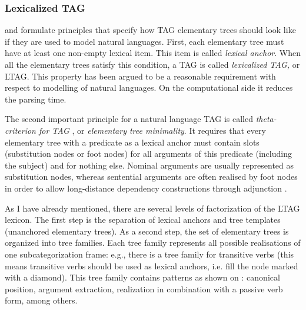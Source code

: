 \subsubsection{Lexicalized TAG} 
\citet{Abeille:02} and \cite{Frank:02} formulate principles that specify how TAG elementary trees should look like if they are used to model natural languages. First, each elementary tree must have at least one non-empty lexical item. This item is called \textit{lexical anchor}. When all the elementary trees satisfy this condition, a TAG is called \textit{lexicalized TAG,} or LTAG. This property has been argued to be a reasonable requirement with respect to modelling of natural languages. On the computational side it reduces the parsing time. 

The second important principle for a natural language TAG is called \textit{theta-criterion for TAG} \citep{Frank:92}, or \textit{elementary tree minimality}. It requires that every elementary tree with a predicate as a lexical anchor must contain slots (substitution nodes or foot nodes) for all arguments of this predicate (including the subject) and for nothing else. Nominal arguments are usually represented as substitution nodes, whereas sentential arguments are often realised by foot nodes in order to allow long-distance dependency constructions through adjunction  \citep{Kroch:89, Frank:02}.


As I have already mentioned, there are several levels of factorization of the LTAG lexicon. The first step is the separation of lexical anchors and tree templates (unanchored elementary trees). As a second step, the set of elementary trees is organized into tree families. Each tree family represents all possible realisations of one subcategorization frame: e.g., there is a tree family for transitive verbs  (this means transitive verbs  should be used as lexical anchors, i.e. fill the node marked with a diamond). This tree family contains patterns as shown on : canonical position, argument extraction, realization in combination with a passive verb form, among others.

